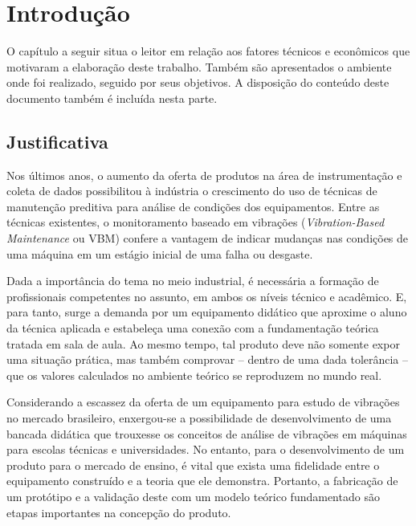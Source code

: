 \documentclass[12pt,openright,twoside,a4paper,
	chapter=TITLE,section=TITLE,
	english,brazil]{abntex2}
\begin{document}
	
	\textual %
	

	\chapter{Introdução}
	O capítulo a seguir situa o leitor em relação aos fatores técnicos e econômicos que motivaram a elaboração deste trabalho. Também são apresentados o ambiente onde foi realizado, seguido por seus objetivos. A disposição do conteúdo deste documento também é incluída nesta parte.
	
	\section{Justificativa}
	
	Nos últimos anos, o aumento da oferta de produtos na área de instrumentação e coleta de dados possibilitou à indústria o crescimento do uso de técnicas de manutenção preditiva para análise de condições dos equipamentos. Entre as técnicas existentes, o monitoramento baseado em vibrações (\textit{Vibration-Based Maintenance} ou VBM) confere a vantagem de indicar mudanças nas condições de uma máquina em um estágio inicial de uma falha ou desgaste\cite{bib:al-najjar}.
	
	Dada a importância do tema no meio industrial, é necessária a formação de profissionais competentes no assunto, em ambos os níveis técnico e acadêmico. E, para tanto, surge a demanda por um equipamento didático que aproxime o aluno da técnica aplicada e estabeleça uma conexão com a fundamentação teórica tratada em sala de aula. Ao mesmo tempo, tal produto deve não somente expor uma situação prática, mas também comprovar -- dentro de uma dada tolerância -- que os valores calculados no ambiente teórico se reproduzem no mundo real.
	
	Considerando a escassez da oferta de um equipamento para estudo de vibrações no mercado brasileiro, enxergou-se a possibilidade de desenvolvimento de uma bancada didática que trouxesse os conceitos de análise de vibrações em máquinas para escolas técnicas e universidades. No entanto, para o desenvolvimento de um produto para o mercado de ensino, é vital que exista uma fidelidade entre o equipamento construído e a teoria que ele demonstra. Portanto, a fabricação de um protótipo e a validação deste com um modelo teórico fundamentado são etapas importantes na concepção do produto.
	
	\postextual
	
	
		
\end{document}
